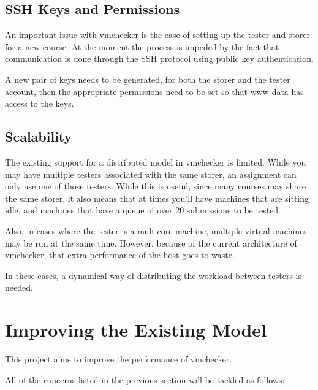 \subsection{SSH Keys and Permissions}
\label{sub-sec:vmc-analysis-ssh}

An important issue with vmchecker is the ease of setting up the tester and storer
for a new course. At the moment the process is impeded by the fact that communication
is done through the SSH protocol using public key authentication. 

A new pair of keys needs to be generated, for both the storer and the tester account,
then the appropriate permissions need to be set so that www-data has access to 
the keys.


\subsection{Scalability}
\label{sub-sec:vmc-analysis-scalability}

The existing support for a distributed model in vmchecker is limited. While
you may have multiple testers associated with the same storer, an assignment
can only use one of those testers. While this is useful, since many courses
may share the same storer, it also means that at times you'll have machines
that are sitting idle, and machines that have a queue of over 20 submissions
to be tested.

Also, in cases where the tester is a multicore machine, multiple virtual
machines may be run at the same time. However, because of the current architecture 
of vmchecker, that extra performance of the host goes to waste.

In these cases, a dynamical way of distributing the workload between testers is 
needed.

\section{Improving the Existing Model}
\label{sec:vmc-improving}

This project aims to improve the performance of vmchecker. 

All of the concerns listed in the previous section will be tackled as follows:

